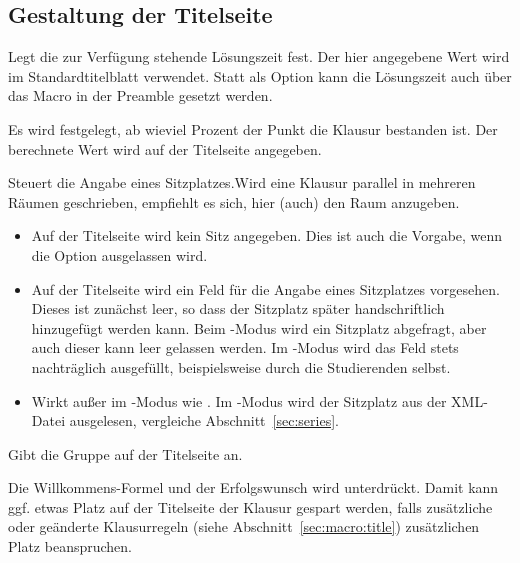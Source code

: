 \documentclass[
load=osgexam,
babel=ngerman
]{skdoc}
\begin{document}
\subsection*{Gestaltung der Titelseite}
Legt die zur Verfügung stehende Lösungszeit fest. Der hier angegebene Wert wird im Standardtitelblatt verwendet.
Statt als Option kann die Lösungszeit auch über das Macro  in der Preamble gesetzt werden.
\medskip

Es wird festgelegt, ab wieviel Prozent der Punkt die Klausur bestanden ist. Der berechnete Wert wird auf der Titelseite
angegeben.
\medskip

 Steuert die Angabe eines Sitzplatzes.Wird eine Klausur parallel in mehreren Räumen
geschrieben, empfiehlt es sich, hier (auch) den Raum anzugeben.
\begin{itemize}[nosep]
  \item [\opt{no}] Auf der Titelseite wird kein Sitz angegeben. Dies ist auch
    die Vorgabe, wenn die Option ausgelassen wird.
  \item [\opt{title}] Auf der Titelseite wird ein Feld für die Angabe eines
    Sitzplatzes vorgesehen. Dieses ist zunächst leer, so dass der Sitzplatz
    später handschriftlich hinzugefügt werden kann. Beim -Modus
    wird ein Sitzplatz abgefragt, aber auch dieser kann leer gelassen werden.
    Im -Modus wird das Feld stets nachträglich ausgefüllt,
    beispielsweise durch die Studierenden selbst.
  \item [\opt{xls}] Wirkt außer im -Modus wie . Im
    -Modus wird der Sitzplatz aus der XML-Datei ausgelesen,
    vergleiche Abschnitt~\ref{sec:series}.
\end{itemize}

\medskip
{}\noindent Gibt die Gruppe auf der Titelseite an.
\medskip

\noindent Die Willkommens-Formel und der Erfolgswunsch wird unterdrückt. Damit kann ggf. etwas Platz auf der
Titelseite der Klausur gespart werden, falls zusätzliche oder geänderte Klausurregeln (siehe Abschnitt~\ref{sec:macro:title})
zusätzlichen Platz beanspruchen. 
\medskip
\end{document}
